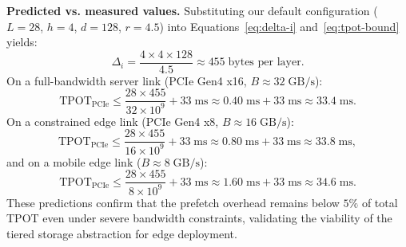 \textbf{Predicted vs. measured values.}  Substituting our default configuration
($L=28$, $h=4$, $d=128$, $r=4.5$) into Equations~\eqref{eq:delta-i}
and~\eqref{eq:tpot-bound} yields:
\begin{equation}
\Delta_i
= \frac{4 \times 4 \times 128}{4.5}
\approx 455\;\text{bytes per layer}.
\end{equation}
On a full-bandwidth server link (PCIe Gen4 x16, $B \approx 32\;\text{GB/s}$):
\begin{equation}
\text{TPOT}_{\text{PCIe}}
\le \frac{28 \times 455}{32 \times 10^{9}} + 33\;\text{ms}
\approx 0.40\;\text{ms} + 33\;\text{ms}
\approx 33.4\;\text{ms}.
\end{equation}
On a constrained edge link (PCIe Gen4 x8, $B \approx 16\;\text{GB/s}$):
\begin{equation}
\text{TPOT}_{\text{PCIe}}
\le \frac{28 \times 455}{16 \times 10^{9}} + 33\;\text{ms}
\approx 0.80\;\text{ms} + 33\;\text{ms}
\approx 33.8\;\text{ms},
\end{equation}
and on a mobile edge link ($B \approx 8\;\text{GB/s}$):
\begin{equation}
\text{TPOT}_{\text{PCIe}}
\le \frac{28 \times 455}{8 \times 10^{9}} + 33\;\text{ms}
\approx 1.60\;\text{ms} + 33\;\text{ms}
\approx 34.6\;\text{ms}.
\end{equation}
These predictions confirm that the prefetch overhead remains below $5\%$ of
total TPOT even under severe bandwidth constraints, validating the viability
of the tiered storage abstraction for edge deployment.
